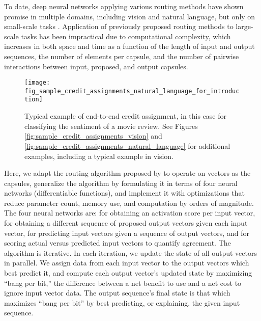 \documentclass[11pt,a4paper]{article}
\begin{document}
To date, deep neural networks applying various routing methods have shown promise in multiple domains, including vision and natural language, but only on small-scale tasks \cite{tsai2020Capsules} \cite{ribeiro2020capsule} \cite{NEURIPS2019_e46bc064} \cite{DBLP:journals/corr/abs-1902-05770} \cite{DBLP:journals/corr/abs-1911-00792} \cite{DBLP:journals/corr/abs-1904-09546} \cite{xinyi2018capsule} \cite{DBLP:journals/corr/abs-1805-10807} \cite{DBLP:journals/corr/abs-1805-10807} \cite{wang2018an} \cite{46653} \cite{DBLP:journals/corr/abs-1710-09829}. Application of previously proposed routing methods to large-scale tasks has been impractical due to computational complexity, which increases in both space and time as a function of the length of input and output sequences, the number of elements per capsule, and the number of pairwise interactions between input, proposed, and output capsules.

\begin{figure*}[t]
	\vskip 0.1in
	\begin{center}
		\centerline{\texttt{[image: fig\_sample\_credit\_assignments\_natural\_language\_for\_introduction]}}
		\caption{Typical example of end-to-end credit assignment, in this case for classifying the sentiment of a movie review. See Figures \ref{fig:sample_credit_assignments_vision} and \ref{fig:sample_credit_assignments_natural_language} for additional examples, including a typical example in vision.}
		\label{fig:sample_credit_assignments_natural_language_for_introduction}
	\end{center}
	\vskip -0.2in
\end{figure*}

Here, we adapt the routing algorithm proposed by \citet{DBLP:journals/corr/abs-1911-00792} to operate on vectors as the capsules, generalize the algorithm by formulating it in terms of four neural networks (differentiable functions), and implement it with optimizations that reduce parameter count, memory use, and computation by orders of magnitude. The four neural networks are:  for obtaining an activation score per input vector,  for obtaining a different sequence of proposed output vectors given each input vector,  for predicting input vectors given a sequence of output vectors, and  for scoring actual versus predicted input vectors to quantify agreement. The algorithm is iterative. In each iteration, we update the state of all output vectors in parallel. We assign data from each input vector to the output vectors which best predict it, and compute each output vector's updated state by maximizing ``bang per bit,'' the difference between a net benefit to use and a net cost to ignore input vector data. The output sequence's final state is that which maximizes ``bang per bit'' by best predicting, or explaining, the given input sequence.
\end{document}
